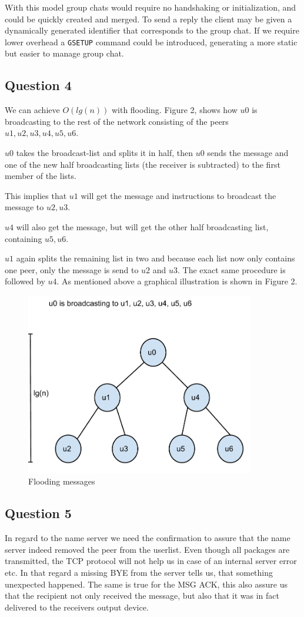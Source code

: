 With this model group chats would require no handshaking or initialization, and
could be quickly created and merged. To send a reply the client may be given a
dynamically generated identifier that corresponds to the group chat. If we require
lower overhead a {\tt GSETUP} command could be introduced, generating a more static
but easier to manage group chat.

\subsection{Question 4}
We can achieve $O(lg(n))$ with flooding. Figure 2, shows how $u0$ is
broadcasting to the rest of the network consisting of the peers
$u1,u2,u3,u4,u5,u6$.

$u0$ takes the broadcast-list and splits it in half, then $u0$ sends the
message and one of the new half broadcasting lists (the receiver
is subtracted) to the first member of the lists.

This implies that $u1$ will get the message and instructions to broadcast the
message to $u2, u3$.

$u4$ will also get the message, but will get the other half broadcasting list,
containing  $u5,u6$.

$u1$ again splits the remaining list in two and because each list now only
contains one peer, only the message is send to $u2$ and $u3$. The exact same
procedure is followed by $u4$. As mentioned above a graphical illustration is
shown in Figure 2.

\begin{figure}[!h]
    \centering
    \includegraphics[width=10cm]{graphics/flooding}
    \caption{Flooding messages}
\end{figure}

\subsection{Question 5}
In regard to the name server we need the confirmation to assure that the name
server indeed removed the peer from the userlist. Even though all packages are
transmitted, the TCP protocol will not help us in case of an internal server
error etc. In that regard a missing BYE from the server tells us, that
something unexpected happened.
The same is true for the MSG ACK, this also assure us that the recipient not
only received the message, but also that it was in fact delivered to the
receivers output device.
